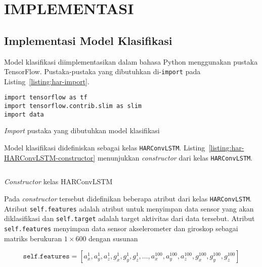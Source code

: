 \chapter{IMPLEMENTASI}

\section{Implementasi Model Klasifikasi}
Model klasifikasi diimplementasikan dalam bahasa Python menggunakan pustaka TensorFlow. Pustaka-pustaka yang dibutuhkan di-\texttt{import} pada Listing~\ref{listing:har-import}.

\begin{listing}[h]
\begin{verbatim}
import tensorflow as tf
import tensorflow.contrib.slim as slim
import data
\end{verbatim}
\caption{\textit{Import} pustaka yang dibutuhkan model klasifikasi}
\label{listing:har-import}
\end{listing}


Model klasifikasi didefiniskan sebagai kelas \texttt{HARConvLSTM}. Listing~\ref{listing:har-HARConvLSTM-constructor} menunjukkan \textit{constructor} dari kelas \texttt{HARConvLSTM}.

\begin{listing}[h]
    \inputminted[firstline=14,firstnumber=14,lastline=31,fontsize=\scriptsize]{python}{../har/har.py}
    \caption{\textit{Constructor} kelas HARConvLSTM}
    \label{listing:har-HARConvLSTM-constructor}
\end{listing}

Pada \textit{constructor} tersebut didefinikan beberapa atribut dari kelas \texttt{HARConvLSTM}. Atribut \texttt{self.features} adalah atribut untuk menyimpan data sensor yang akan diklasifikasi dan \texttt{self.target} adalah target aktivitas dari data tersebut. Atribut \texttt{self.features} menyimpan data sensor akselerometer dan giroskop sebagai matriks berukuran $1 \times 600$ dengan susunan

\begin{equation}
    \texttt{self.features} = [a_x^1, a_y^1, a_z^1, g_x^1, g_y^1, g_z^1,\dots, a_x^{100}, a_y^{100}, a_z^{100}, g_x^{100}, g_y^{100}, g_z^{100}]
\end{equation}

